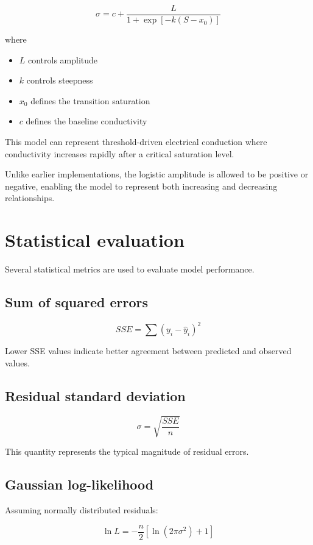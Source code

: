 \documentclass[11pt]{article}
\begin{document}
\[
\sigma =
c + \frac{L}{1+\exp[-k(S-x_0)]}
\]

where

\begin{itemize}

\item $L$ controls amplitude
\item $k$ controls steepness
\item $x_0$ defines the transition saturation
\item $c$ defines the baseline conductivity

\end{itemize}

This model can represent threshold-driven electrical conduction where conductivity increases rapidly after a critical saturation level.

Unlike earlier implementations, the logistic amplitude is allowed to be positive or negative, enabling the model to represent both increasing and decreasing relationships.

\section{Statistical evaluation}

Several statistical metrics are used to evaluate model performance.

\subsection{Sum of squared errors}

\[
SSE = \sum (y_i - \hat{y}_i)^2
\]

Lower SSE values indicate better agreement between predicted and observed values.

\subsection{Residual standard deviation}

\[
\sigma = \sqrt{\frac{SSE}{n}}
\]

This quantity represents the typical magnitude of residual errors.

\subsection{Gaussian log-likelihood}

Assuming normally distributed residuals:

\[
\ln L =
-\frac{n}{2}
\left[
\ln(2\pi\sigma^2)+1
\right]
\]
\end{document}
